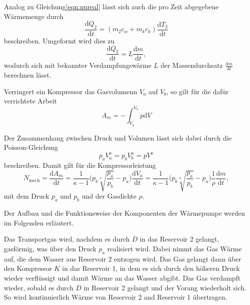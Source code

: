 Analog zu Gleichung\ref{eqn:nureal} lässt sich auch die pro Zeit abgegebene Wärmemenge durch 
\begin{equation}
    \frac{\text{d}Q_2}{\text{d}t} = (m_2c_w + m_kc_k)\frac{\text{d}T_2}{\text{d}t} 
\end{equation}
beschreiben. Umgeformt wird dies zu 
\begin{equation}
    \frac{\text{d}Q_2}{\text{d}t} = L\frac{\text{d}m}{\text{d}t},
\end{equation}
wodurch sich mit bekannter Verdampfungswärme $L$ der Massendurchsatz $\frac{\text{d}m}{\text{d}t}$ berechnen lässt.

Verringert ein Kompressor das Gasvolumenn $V_a$ auf $V_b$, so gilt für die dafür verrichtete Arbeit
\begin{equation}
    A_m = - \int_{V_a}^{V_b} p\text{d}V
\end{equation}

Der Zusammenhang zwischen Druck und Volumen lässt sich dabei durch die Poisson-Gleichung 
\begin{equation}
    p_aV_a^\kappa = p_bV_b^\kappa = pV^\kappa
\end{equation}
beschreiben. Damit gilt für die Kompressorleistung
\begin{equation}
    N_{\text{mech}} = \frac{\text{d}A_m}{\text{d}t} = \frac{1}{\kappa -1} \biggl(p_b \sqrt[\kappa]{\frac{p_a}{p_b}}-p_a \biggr)\frac{\text{d}V_a}{\text{d}t}
    = \frac{1}{\kappa -1} \biggl(p_b \sqrt[\kappa]{\frac{p_a}{p_b}}-p_a \biggr)\frac{1}{\rho}\frac{\text{d}m}{\text{d}t},
\end{equation}
mit dem Druck $p_a$ und $p_b$ und der Gasdichte $\rho$.

Der Aufbau und die Funktionsweise der Komponenten der Wärmepumpe werden im Folgenden erläutert.

Das Transportgas wird, nachdem es durch $D$ in das Reservoir 2 gelangt, gasförmig, was über den Druck $p_a$ realisiert wird.
Dabei nimmt das Gas Wärme auf, die dem Wasser aus Reservoir 2 entzogen wird. Das Gas gelangt dann über den Kompressor $K$ in das 
Reservoir 1, in dem es sich durch den höheren Druck wieder verflüssigt und damit Wärme an das Wasser abgibt. Das Gas verdampft 
wieder, sobald es durch $D$ in Reservoir 2 gelangt und der Vorang wiederholt sich. So wird kontinuierlich Wärme von Reservoir 2
and Reservoir 1 übertragen.



